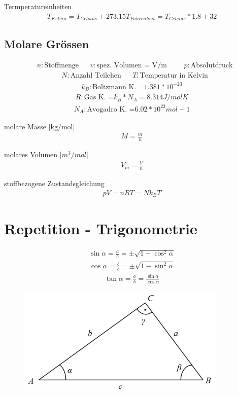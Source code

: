 \documentclass[17pt]{extarticle}
\begin{document}
	Termperatureinheiten
	\begin{align}
		T_{Kelvin} = T_{Celsius} + 273.15
		T_{Fahrenheit} = T_{Celsius} * 1.8 + 32
	\end{align}


\subsection{Molare Grössen}
	\begin{align}
		&n: \text{Stoffmenge}
		&&v: \text{spez. Volumen = V/m}
		&&&p: \text{Absolutdruck}
	\end{align}
	\begin{align}
		&N: \text{Anzahl Teilchen}
		&&T: \text{Temperatur in Kelvin}
	\end{align}
	\begin{align}
		k_B: \text{Boltzmann K. =} 1.381 * 10^{-23}
	\end{align}
	\begin{align}		
		R: \text{Gas K. =} k_B * N_A = 8.314 J/mol K
	\end{align}
	\begin{align}
		N_A: \text{Avogadro K. =} 6.02 * 10^{23} mol-1
	\end{align}

	molare Masse [kg/mol]
	\begin{align}
		M = \frac{m}{n}
	\end{align}

	molares Volumen [$m^3/mol$]
	\begin{align}
		V_m = \frac{V}{n}
	\end{align}
	
	stoffbezogene Zustandsgleichung
	\begin{align}
		pV = n R T = N k_B T
	\end{align}
	
\section{Repetition - Trigonometrie}
	\begin{align}
		\sin \alpha = \frac{a}{c} = \pm \sqrt{1 - \cos^2 \alpha}
	\end{align}
	\begin{align}
		\cos \alpha = \frac{b}{c} = \pm \sqrt{1 - \sin^2 \alpha}
	\end{align}
	\begin{align}
		\tan \alpha = \frac{a}{b} = \frac{\sin \alpha}{\cos \alpha}
	\end{align}
	\begin{figure}[h!]
		\centering
		\includegraphics[width=10cm]{img/Trigonometrie.png}
	\end{figure}
	
\end{document}
